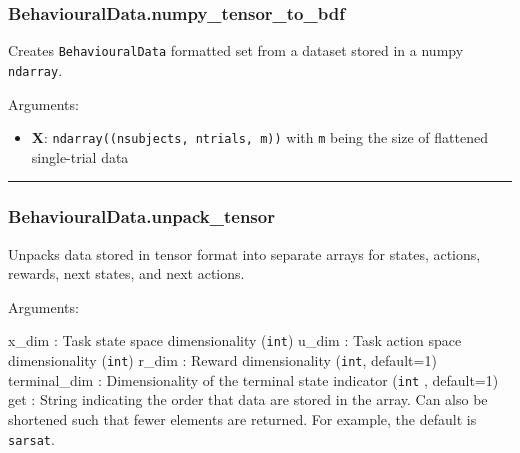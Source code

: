 \hypertarget{behaviouraldata.numpy_tensor_to_bdf}{%
\subsubsection{BehaviouralData.numpy\_tensor\_to\_bdf}\label{behaviouraldata.numpy_tensor_to_bdf}}

\begin{Shaded}
\begin{Highlighting}[]
\end{Highlighting}
\end{Shaded}

Creates \texttt{BehaviouralData} formatted set from a dataset stored in
a numpy \texttt{ndarray}.

Arguments:

\begin{itemize}
\tightlist
\item
  \textbf{X}: \texttt{ndarray((nsubjects,\ ntrials,\ m))} with
  \texttt{m} being the size of flattened single-trial data
\end{itemize}

\begin{center}\rule{0.5\linewidth}{\linethickness}\end{center}

\hypertarget{behaviouraldata.unpack_tensor}{%
\subsubsection{BehaviouralData.unpack\_tensor}\label{behaviouraldata.unpack_tensor}}

\begin{Shaded}
\begin{Highlighting}[]
\OperatorTok{=}\OperatorTok{=}\OperatorTok{=}\NormalTok{)}
\end{Highlighting}
\end{Shaded}

Unpacks data stored in tensor format into separate arrays for states,
actions, rewards, next states, and next actions.

Arguments:

x\_dim : Task state space dimensionality (\texttt{int}) u\_dim : Task
action space dimensionality (\texttt{int}) r\_dim : Reward
dimensionality (\texttt{int}, default=1) terminal\_dim : Dimensionality
of the terminal state indicator (\texttt{int} , default=1) get : String
indicating the order that data are stored in the array. Can also be
shortened such that fewer elements are returned. For example, the
default is \texttt{sarsat}.

